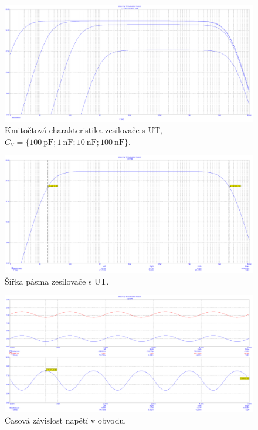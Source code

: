 \documentclass{protokol}
\begin{document}
	\begin{figure}[h!]
		\centering
		\includegraphics[width=\textwidth]{microcap/xFET/Frekvecni_prubeh_Cv_step.png}
		\centering
		\caption{Kmitočtová charakteristika zesilovače s UT, $ C_{V}= \{\SI{100}{\pico\farad};\SI{1}{\nano\farad};\SI{10}{\nano\farad};\SI{100}{\nano\farad}\} $.}
		\label{fig:-mc_}
	\end{figure}
	
	\begin{figure}[h!]
		\centering
		\includegraphics[width=\textwidth]{microcap/xFET/Frekvecni_prubeh.png}
		\centering
		\caption{Šířka pásma zesilovače s UT.}
		\label{fig:-mc_}
	\end{figure}
	
	\begin{figure}[h!]
		\centering
		\includegraphics[width=\textwidth]{microcap/xFET/Prubehy_1.png}
		\centering
		\caption{Časová závislost napětí v obvodu.}
		\label{fig:-mc_}
	\end{figure}
	
\end{document}
